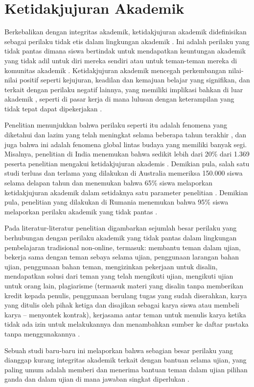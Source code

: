 \section{Ketidakjujuran Akademik}
\label{sec:ketidakjujuranakademik}

Berkebalikan dengan integritas akademik, ketidakjujuran akademik didefinisikan sebagai perilaku tidak etis dalam lingkungan akademik \citep{muhammad2020factors}. Ini adalah perilaku yang tidak pantas dimana siswa bertindak untuk mendapatkan keuntungan akademik yang tidak adil untuk diri mereka sendiri atau untuk teman-teman mereka di komunitas akademik \citep{grira2019rationality}. Ketidakjujuran akademik mencegah perkembangan nilai-nilai positif seperti kejujuran, keadilan dan kemajuan belajar yang signifikan, dan terkait dengan perilaku negatif lainnya, yang memiliki implikasi bahkan di luar akademik \citet{krou2020achievement} \citep{yu2018college}, seperti di pasar kerja di mana lulusan dengan keterampilan yang tidak tepat dapat dipekerjakan \citep{barbaranelli2018machiavellian} \citep{bashir2018development}.

Penelitian menunjukkan bahwa perilaku seperti itu adalah fenomena yang diketahui dan lazim yang telah meningkat selama beberapa tahun terakhir \citep{birks2020managing} \citep{grira2019rationality} \citep{harper2021detecting}, dan juga bahwa ini adalah fenomena global lintas budaya yang memiliki banyak segi. Misalnya, penelitian di India menemukan bahwa sedikit lebih dari 20\% dari 1.369 peserta penelitian mengakui ketidakjujuran akademis \citep{stearns2001student}. Demikian pula, salah satu studi terluas dan terlama yang dilakukan di Australia memeriksa 150.000 siswa selama delapan tahun dan menemukan bahwa 65\% siswa melaporkan ketidakjujuran akademik dalam setidaknya satu parameter penelitian \citep{duff2006international}. Demikian pula, penelitian yang dilakukan di Rumania menemukan bahwa 95\% siswa melaporkan perilaku akademik yang tidak pantas \citep{ives2017patterns}.

Pada literatur-literatur penelitian digambarkan sejumlah besar perilaku yang berhubungan dengan perilaku akademik yang tidak pantas dalam lingkungan pembelajaran tradisional non-online, termasuk: membantu teman dalam ujian, bekerja sama dengan teman sebaya selama ujian, penggunaan larangan bahan ujian, penggunaan bahan teman, mengizinkan pekerjaan untuk disalin, mendapatkan solusi dari teman yang telah mengikuti ujian, mengikuti ujian untuk orang lain, plagiarisme (termasuk materi yang disalin tanpa memberikan kredit kepada penulis, penggunaan berulang tugas yang sudah diserahkan, karya yang ditulis oleh pihak ketiga dan disajikan sebagai karya siswa atau membeli karya – menyontek kontrak), kerjasama antar teman untuk menulis karya ketika tidak ada izin untuk melakukannya dan menambahkan sumber ke daftar pustaka tanpa menggunakannya \citep{denisova2017challenges} \citep{harper2021detecting} \citep{von2001can} \citep{yu2018college}.  

Sebuah studi baru-baru ini melaporkan bahwa sebagian besar perilaku yang dianggap kurang integritas akademik terkait dengan bantuan selama ujian, yang paling umum adalah memberi dan menerima bantuan teman dalam ujian pilihan ganda dan dalam ujian di mana jawaban singkat diperlukan \citep{harper2021detecting}.
